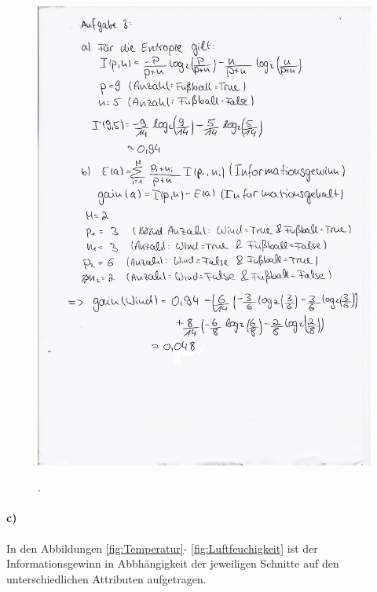 \newpage
%


\begin{figure}
  \centering
  \includegraphics[width=\textwidth]{PhotoScan.jpg}
  \caption{}.
  \label{fig:1}
\end{figure}


\FloatBarrier

\paragraph{c)}
In den Abbildungen \ref{fig:Temperatur}- \ref{fig:Luftfeuchigkeit}
ist der Informationsgewinn
in Abbhängigkeit der jeweiligen Schnitte auf den
unterschiedlichen Attributen aufgetragen.



